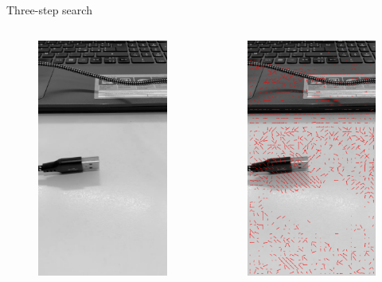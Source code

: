 \documentclass[aspectratio=1610,xcolor=dvipsnames]{beamer}
\begin{document}
\begin{frame}{Three-step search}
	
	\begin{columns}
		\begin{column}{0.5\textwidth}
			\begin{figure}
				\centering
				\includegraphics[keepaspectratio, width=.5\linewidth]{images/bbme-im.png}
			\end{figure}
		\end{column}
		\begin{column}{0.5\textwidth}
			\begin{figure}
				\centering
				\includegraphics[keepaspectratio, width=.5\linewidth]{images/bbme-1-res.png}
			\end{figure}
		\end{column}
	\end{columns}
\end{frame}
\end{document}
